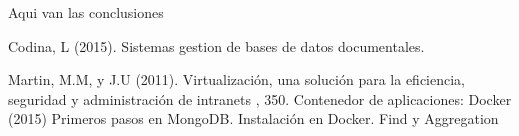 \documentclass[twoside,twocolumn]{article}
\begin{document}
Aqui van las conclusiones



\begin{thebibliography}{99} 
Codina, L (2015).
\newblock Sistemas gestion de bases de datos documentales.


Martin, M.M,  y J.U (2011).
\newblock Virtualización, una solución para la eficiencia,
seguridad y administración de intranets
, 350.
\newblock Contenedor de aplicaciones: Docker (2015)
\newblock Primeros pasos en MongoDB. Instalación en Docker. Find y Aggregation
 
 
\end{thebibliography}

\end{document}
